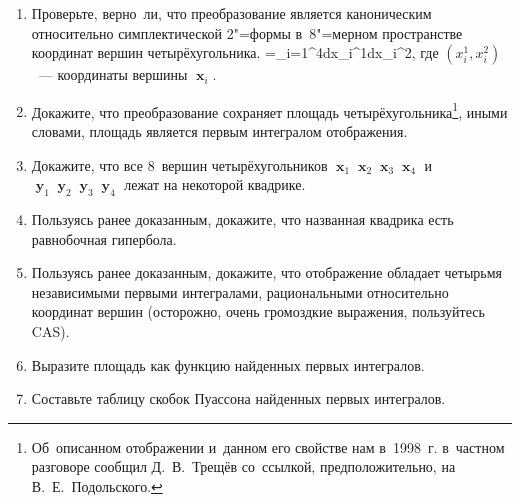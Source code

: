 \documentclass[a4paper,11pt]{article}
\def\[#1\]{\begin{align*}#1\end{align*}}
\theoremstyle{definition}
\begin{document}
\begin{enumerate}
\item
Проверьте, верно~ли, что преобразование является каноническим относительно
симплектической 2"=формы в~8"=мерном пространстве координат вершин
четырёхугольника.
	\[
	\omega=\sum_{i=1}^4dx_i^1\wedge dx_i^2,
	\]
где $(x_i^1,x_i^2)$~— координаты вершины $\mbfx_i$.

\item
Докажите, что преобразование сохраняет площадь
четырёхугольника\footnote{Об~описанном отображении и~данном его свойстве нам
в~1998~г. в~частном разговоре сообщил Д.~В.~Трещёв со~ссылкой,
предположительно, на В.~Е.~Подольского.}, иными словами, площадь является
первым интегралом отображения.

\item
Докажите, что все 8~вершин четырёхугольников $\mbfx_1\mbfx_2\mbfx_3\mbfx_4$
и~$\mbfy_1\mbfy_2\mbfy_3\mbfy_4$ лежат на некоторой квадрике.

\item
Пользуясь ранее доказанным, докажите, что названная квадрика есть равнобочная
гипербола.

\item
Пользуясь ранее доказанным, докажите, что отображение обладает четырьмя
независимыми первыми интегралами, рациональными относительно координат вершин
(осторожно, очень громоздкие выражения, пользуйтесь CAS).

\item
Выразите площадь как функцию найденных первых интегралов.

\item
Составьте таблицу скобок Пуассона найденных первых интегралов.

\end{enumerate}
\end{document}

